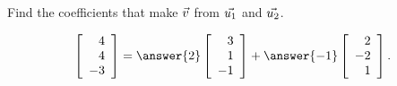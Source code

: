 \documentclass{ximera}
\author{Zack Reed}
\begin{document}
\begin{problem}
  Find the coefficients that make $\vec{v}$ from $\vec{u_1}$ and $\vec{u_2}$.
  
  \begin{equation*}
    \startmat{r}
      4 \\
      4 \\
      -3
    \stopmat
    =
    \answer{2}
    \startmat{r}
      3 \\
      1 \\
      -1
    \stopmat
    + \answer{-1}
    \startmat{r}
      2 \\
      -2 \\
      1
    \stopmat.
  \end{equation*}
  
\end{problem}
\end{document}

